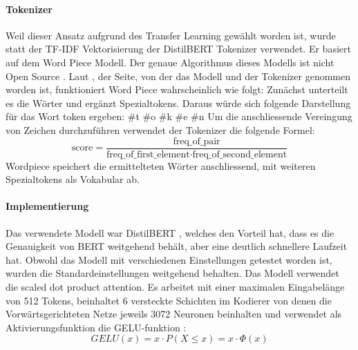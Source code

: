\paragraph{Tokenizer}
Weil dieser Ansatz aufgrund des Transfer Learning gewählt worden ist, wurde statt der TF-IDF Vektorisierung der DistilBERT Tokenizer verwendet. Er basiert auf dem Word Piece Modell. Der genaue Algorithmus dieses Modells ist nicht Open Source . Laut  \cite{WordpieceSource}, der Seite, von der das Modell und der Tokenizer genommen worden ist, funktioniert Word Piece wahrscheinlich wie folgt: Zunächst unterteilt es die Wörter und ergänzt Spezialtokens. Daraus würde sich folgende Darstellung für das Wort token ergeben: \#t \#o \#k \#e \#n
Um die anschliessende Vereingung von Zeichen durchzuführen verwendet der Tokenizer die folgende Formel:
$$
    \text{score} = \frac{\text{freq\_of\_pair}}{\text{freq\_of\_first\_element} \cdot \text{freq\_of\_second\_element}}
$$
Wordpiece speichert die ermittelteten Wörter anschliessend, mit weiteren Spezialtokens als Vokabular ab.

\paragraph{Implementierung}
Das verwendete Modell war DistilBERT \cite{Sanh2019}, welches den Vorteil hat, dass es die Genauigkeit von BERT weitgehend behält, aber eine deutlich schnellere Laufzeit hat. Obwohl das Modell mit verschiedenen Einstellungen getestet worden ist, wurden die Standardeinstellungen weitgehend behalten. Das Modell verwendet die scaled dot product attention. Es arbeitet mit einer maximalen Eingabelänge von 512 Tokens, beinhaltet 6 versteckte Schichten im Kodierer von denen die Vorwärtsgerichteten Netze jeweils 3072 Neuronen beinhalten und verwendet als Aktivierungsfunktion die GELU-funktion \cite{Hendrycks2016}:
$$GELU(x) = x \cdot P(X \leq x) = x \cdot \Phi(x) $$
